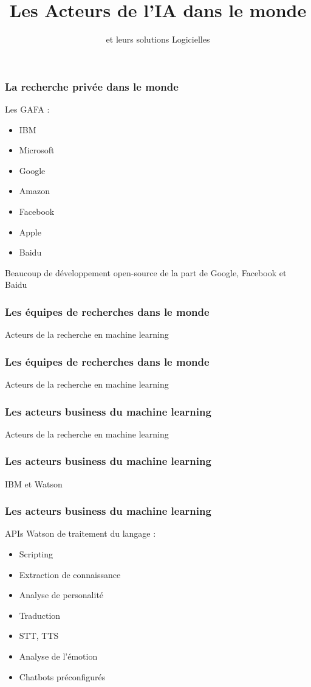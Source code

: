 \documentclass{formation}
\title{Les Acteurs de l'IA dans le monde}
\subtitle{et leurs solutions Logicielles}
\begin{document}
\maketitle

\begin{frame}
  \frametitle{La recherche privée dans le monde}
  Les GAFA :
  \begin{itemize}
  \item IBM
  \item Microsoft
  \item Google
  \item Amazon
  \item Facebook
  \item Apple
  \item Baidu
  \end{itemize}
  Beaucoup de développement open-source de la part de Google, Facebook et Baidu
\end{frame}

\begin{frame}
  \frametitle{Les équipes de recherches dans le monde}
  Acteurs de la recherche en machine learning
\end{frame}

\begin{frame}
  \frametitle{Les équipes de recherches dans le monde}
  Acteurs de la recherche en machine learning
\end{frame}

\begin{frame}
  \frametitle{Les acteurs business du machine learning}
  Acteurs de la recherche en machine learning
\end{frame}

\begin{frame}
  \frametitle{Les acteurs business du machine learning}
  IBM et Watson
\end{frame}

\begin{frame}
  \frametitle{Les acteurs business du machine learning}
  APIs Watson de traitement du langage :
  \begin{minipage}[c]{0.49\linewidth}
    \begin{itemize}
    \item Scripting
    \item Extraction de connaissance
    \item Analyse de personalité
    \item Traduction
    \item STT, TTS
    \item Analyse de l'émotion
    \item Chatbots préconfigurés
    \end{itemize}
  \end{minipage}\hfill
  \begin{minipage}[c]{0.49\linewidth}
  \end{minipage}\hfill
\end{frame}
\end{document}
